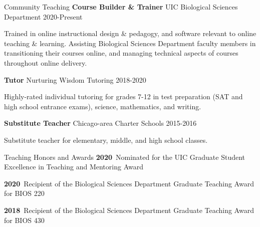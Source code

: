 \documentclass[]{resume}
\begin{document}

\begin{rSection}{Community Teaching}
    \textbf{Course Builder \& Trainer} UIC Biological Sciences
Department \hfill 2020-Present
     
    \vspace{-0.30cm}
     Trained in online instructional design \& pedagogy, and software
relevant to online teaching \& learning. Assisting Biological Sciences
Department faculty members in transitioning their courses online, and
managing technical aspects of courses throughout online delivery.\\
     
\vspace{-0.3cm}

    \textbf{Tutor} Nurturing Wisdom Tutoring \hfill 2018-2020
     
    \vspace{-0.30cm}
     Highly-rated individual tutoring for grades 7-12 in test
preparation (SAT and high school entrance exams), science, mathematics,
and writing.\\
     
\vspace{-0.3cm}

    \textbf{Substitute Teacher} Chicago-area Charter
Schools \hfill 2015-2016
     
    \vspace{-0.30cm}
     Substitute teacher for elementary, middle, and high school
classes.\\
     
\vspace{-0.3cm}

\end{rSection}



\begin{rSection}{Teaching Honors and Awards}
\textbf{2020}\ Nominated for the UIC Graduate Student Excellence in
Teaching and Mentoring Award

\textbf{2020}\ Recipient of the Biological Sciences Department Graduate
Teaching Award for BIOS 220

\textbf{2018}\ Recipient of the Biological Sciences Department Graduate
Teaching Award for BIOS 430

\end{rSection}
\end{document}
